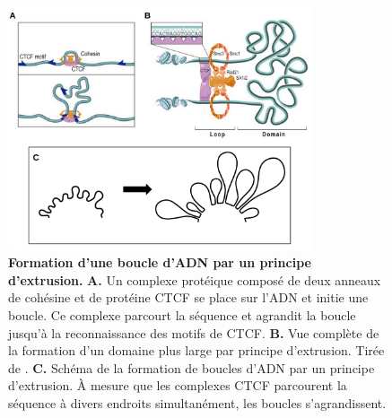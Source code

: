 \begin{figure}[H]
 \centering
 \includegraphics[width=0.8\textwidth, page=1] {figures/introduction/fig13.png}
 \caption[Formation d'une boucle d'\acrshort{ADN} par un principe d'extrusion.]{
 \textbf{Formation d'une boucle d'\acrshort{ADN} par un principe d'extrusion.}
 \textbf{A.} Un complexe protéique composé de deux anneaux de cohésine et de protéine CTCF se place sur l'ADN et initie une boucle. Ce complexe parcourt la séquence et agrandit la boucle jusqu'à la reconnaissance des motifs de CTCF. \textbf{B.} Vue complète de la formation d'un domaine plus large par principe d'extrusion. Tirée de \citet{sanborn_chromatin_2015}.
 \textbf{C.} Schéma de la formation de boucles d'ADN par un principe d'extrusion. \`A mesure que les complexes CTCF parcourent la séquence à divers endroits simultanément, les boucles s'agrandissent.
 \\
 }
 \label{fig:Fig13}
\end{figure}

